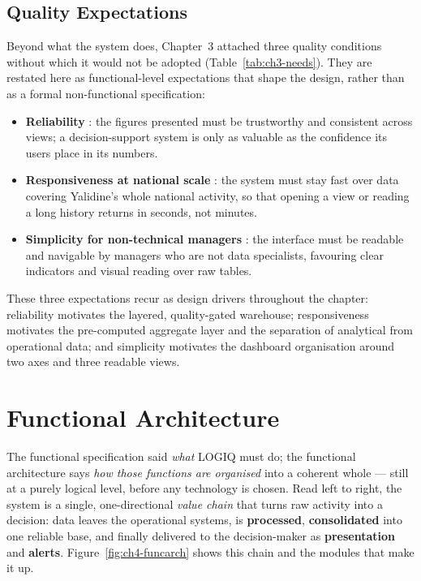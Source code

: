 \subsection{Quality Expectations}
\label{subsec:ch4-quality}

Beyond what the system does, Chapter~3 attached three quality conditions without which it would not be
adopted (Table~\ref{tab:ch3-needs}). They are restated here as functional-level expectations that
shape the design, rather than as a formal non-functional specification:

\begin{itemize}[noitemsep]
    \item \textbf{Reliability} : the figures presented must be trustworthy and consistent across
          views; a decision-support system is only as valuable as the confidence its users place in
          its numbers.
    \item \textbf{Responsiveness at national scale} : the system must stay fast over data covering
          Yalidine's whole national activity, so that opening a view or reading a long history returns
          in seconds, not minutes.
    \item \textbf{Simplicity for non-technical managers} : the interface must be readable and
          navigable by managers who are not data specialists, favouring clear indicators and visual
          reading over raw tables.
\end{itemize}

These three expectations recur as design drivers throughout the chapter: reliability motivates the
layered, quality-gated warehouse; responsiveness motivates the pre-computed aggregate layer and the
separation of analytical from operational data; and simplicity motivates the dashboard organisation
around two axes and three readable views.


\section{Functional Architecture}
\label{sec:ch4-funcarch}

The functional specification said \emph{what} LOGIQ must do; the functional architecture says \emph{how
those functions are organised} into a coherent whole --- still at a purely logical level, before any
technology is chosen. Read left to right, the system is a single, one-directional \emph{value chain}
that turns raw activity into a decision: data leaves the operational systems, is \textbf{processed},
\textbf{consolidated} into one reliable base, and finally delivered to the decision-maker as
\textbf{presentation} and \textbf{alerts}. Figure~\ref{fig:ch4-funcarch} shows this chain and the
modules that make it up.

